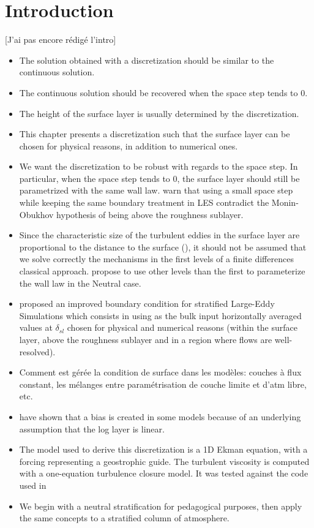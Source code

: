 \section{Introduction}
{\color{red} [J'ai pas encore rédigé l'intro]}
\begin{itemize}
\item The solution obtained with a discretization
	should be similar to the continuous solution.
\item The continuous solution should be recovered when
	the space step tends to 0.
\item The height of the surface layer
	is usually determined by the discretization.
\item This chapter presents a discretization such that
	the surface layer can be chosen for physical reasons,
	in addition to numerical ones.
\item We want the discretization to be robust with regards to
	the space step. In particular, when the space step
	tends to 0, the surface layer should still
	be parametrized with the same wall law.
	\cite{basu_cautionary_2017} warn that
	using a small space step while keeping
	the same boundary treatment in LES contradict the Monin-Obukhov
	hypothesis of being above the roughness sublayer.
\item Since the characteristic
	size of the turbulent eddies in the surface layer are
		proportional to the distance to the surface (\cite{kawai_wall-modeling_2012}),
		it should not be assumed that we solve
		correctly the mechanisms in the first levels
		of a finite differences classical approach.
		\cite{kawai_wall-modeling_2012} propose to use other
		levels than the first to parameterize the
		wall law in the Neutral case.
	\item \cite{maronga_improved_2020} proposed an improved
		boundary condition for stratified Large-Eddy Simulations
		which consists in using as the bulk input
		horizontally averaged values at
		$\delta_{sl}$ chosen for physical and numerical
		reasons (within the surface layer, above the
		roughness sublayer and in a region where flows are
		well-resolved).
\item Comment est gérée la condition de surface dans les modèles:
	couches à flux constant, les mélanges entre paramétrisation
	de couche limite et d'atm libre, etc.
\item \cite{nishizawa_surface_2018} have shown that a bias is created
	in some models
	because of an underlying assumption that the log layer
		is linear.
	\item The model used to derive this discretization is a 1D Ekman
	equation, with a forcing representing a geostrophic guide.
		The turbulent viscosity is computed with a
		one-equation turbulence closure model. It was
		tested against the code used in \cite{lemarie_simplified_2021}
\item We begin with a neutral stratification for pedagogical purposes,
	then apply the same concepts to a stratified column of
		atmosphere.
\end{itemize}
